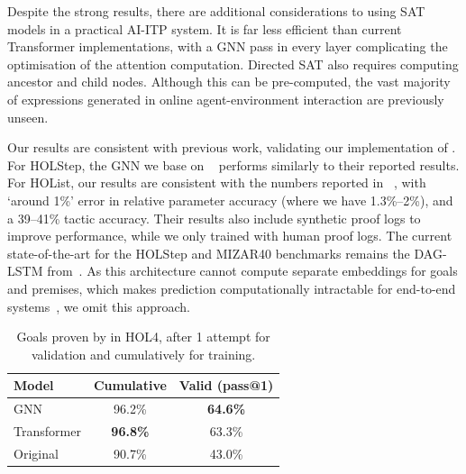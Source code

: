 \documentclass[letterpaper]{article} %
\newcommand{\sysname}{\textsc{\sffamily{Bait}}}
\newcommand\alg[1]{\textsc{\sffamily{#1}}}%
\newcommand\system[1]{#1}
\newcommand\dataset[1]{#1}
\begin{document}
    Despite the strong results,
    there are additional considerations to using SAT models in a practical AI-ITP system. It is far less efficient than current Transformer implementations, with a GNN pass in every layer complicating the optimisation of the attention computation.
    Directed SAT also requires computing ancestor and child nodes. Although this can be pre-computed, the vast majority of expressions generated in online agent-environment interaction are previously unseen.

    Our results are consistent with previous work, validating our implementation of \sysname{}.
    For \dataset{HOLStep}, the GNN we base on ~\cite{wang_premise_2017} performs similarly to their reported results.
    For \dataset{HOList}, our results are consistent with the numbers reported in ~\cite{bansal_holist_2019}, with `around 1\%' error in relative parameter accuracy (where we have 1.3\%--2\%), and a 39--41\% tactic accuracy. Their results also include synthetic proof logs to improve performance, while we only trained with human proof logs.
    The current state-of-the-art for the \dataset{HOLStep} and \dataset{MIZAR40} benchmarks remains the DAG-LSTM from~\cite{crouse_improving_2020}.
    As this architecture cannot compute separate embeddings for goals and premises, which makes prediction computationally intractable for end-to-end systems~\cite{wu_tacticzero_2021, paliwal_graph_2020, yang_leandojo_2023}, we omit this approach.



    \begin{table}[h]
        \centering
        \begin{tabular}{lcc}
            \toprule
            Model                     & Cumulative      & Valid (pass@1)  \\
            \midrule
            GNN                       & 96.2\%          & \textbf{64.6\%} \\
            Transformer               & \textbf{96.8\%} & 63.3\%          \\
            Original \alg{TacticZero} & 90.7\%          & 43.0\%          \\
            \bottomrule
        \end{tabular}
        \caption{Goals proven by \alg{TacticZero} in \system{HOL4}, after 1 attempt for validation and cumulatively for training.}
        \label{fig:tz_plotfirst}
    \end{table}%
\end{document}
